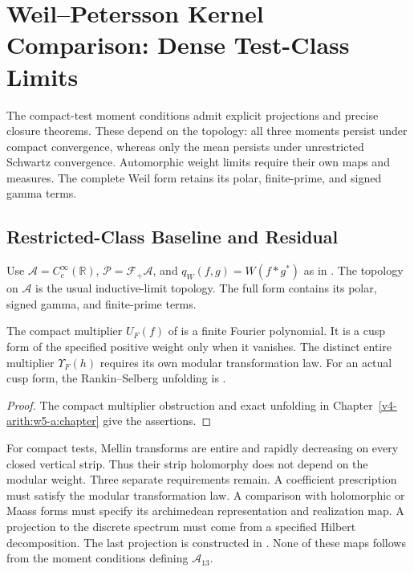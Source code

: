 \chapter{Weil--Petersson Kernel Comparison: Dense Test-Class Limits}
\label{v4-arith:w6-b:chapter}


The compact-test moment conditions admit explicit projections and
precise closure theorems. These depend on the topology: all three
moments persist under compact convergence, whereas only the mean
persists under unrestricted Schwartz convergence. Automorphic
weight limits require their own maps and measures. The complete
Weil form retains its polar, finite-prime, and signed gamma terms.
\section{Restricted-Class Baseline and Residual}
\label{v4-arith:w6-b:baseline}


Use $\mathscr A=C_c^\infty(\mathbb R)$, $\mathscr P=\mathcal F_+\mathscr A$,
and $q_W(f,g)=W(f*g^*)$ as in .
The topology on $\mathscr A$ is the usual inductive-limit topology.
The full form contains its polar, signed gamma, and finite-prime terms.

\begin{theorem}
\label{v4-arith:w6-b:thm:baseline}
The compact multiplier $U_F(f)$ of
 is a finite Fourier polynomial.
It is a cusp form of the specified positive weight only when it
vanishes. The distinct entire multiplier $\Upsilon_F(h)$ requires
its own modular transformation law. For an actual cusp form, the
Rankin--Selberg unfolding is
.
\end{theorem}
\begin{proof}
The compact multiplier obstruction and exact unfolding in
Chapter~\ref{v4-arith:w5-a:chapter} give the assertions.
\end{proof}

\begin{remark}
\label{v4-arith:w6-b:rem:domain-boundary}
For compact tests, Mellin transforms are entire and rapidly decreasing
on every closed vertical strip. Thus their strip holomorphy does not
depend on the modular weight. Three separate requirements remain.
A coefficient prescription must satisfy the modular transformation
law. A comparison with holomorphic or Maass forms must specify its
archimedean representation and realization map. A projection to the
discrete spectrum must come from a specified Hilbert decomposition.
The last projection is constructed in
. None of these maps follows
from the moment conditions defining $\mathscr A_{13}$.
\end{remark}
